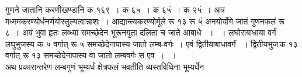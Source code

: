 \documentclass[11pt, openany]{book}
\begin{document}
\begin{sloppypar}
गुणने जातानि करणीखण्डानि क १६९~। क ६५~। क ६५ं~। क २५ं~। अत्र मध्ममकरण्योर्धनर्णयोस्तुल्यत्वान्नाशः~। आद्यान्त्यकरण्योर्मूले रू १३ रू ५ं अनयोर्योगे जातं गुणनफलं रू ८~। अयं भुवा हृतः \; लब्ध्या समच्छेदेन भूरूनयुता दलिता च जाते आबाधे ~। ~। लघोराबाधाया वर्गं \; लघुभुजस्य क ५ वर्गात् रू ५ समच्छेदेनापास्य \; जातो लम्ब-वर्गः~। एवं द्वितीयाबाधावर्गं ~। द्वितीयभुज\textendash \,क १३\textendash \,वर्गात् रू १३ समच्छेदेनापास्य वा जातो लम्बवर्गः स एव~। ~। \\

अथ प्रकारान्तरेण लम्बगुणं भूम्यर्धं क्षेत्रफलं भवतीति व्यस्तविधिना भूम्यर्धेन
\end{sloppypar}
\end{document}
